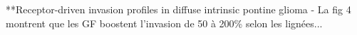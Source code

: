 \documentclass[11pt,a4paper]{article}
\begin{document}
**Receptor-driven invasion profiles in diffuse intrinsic pontine glioma
- La fig 4 montrent que les GF boostent l'invasion de 50 à  200\% selon les lignées...
\end{document}
